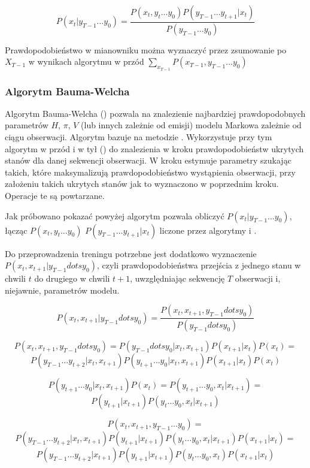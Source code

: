 $$P(x_t | y_{T-1} \dots y_0) = \frac{P(x_t, y_t \dots y_0) P(y_{T-1} \dots y_{t+1} | x_t)}{P(y_{T-1} \dots y_0)}$$

Prawdopodobieństwo w mianowniku można wyznaczyć przez zsumowanie po $X_{T-1}$ w wynikach algorytmu w przód $\sum_{x_{T-1}} P(x_{T-1}, y_{T-1} \dots y_0)$

\subsubsection{Algorytm Bauma-Welcha}

Algorytm Bauma-Welcha () pozwala na znalezienie najbardziej prawdopodobnych parametrów
$H$, $\pi$, $V$ (lub innych zależnie od emisji) modelu Markowa zależnie od ciągu obserwacji. Algorytm bazuje na metodzie
. Wykorzystuje przy tym algorytm w przód i w tył () 
do znalezienia w kroku  prawdopodobieństw ukrytych stanów dla danej sekwencji obserwacji. 
W kroku  estymuje parametry szukając takich, które maksymalizują prawdopodobieństwo wystąpienia
obserwacji, przy założeniu takich ukrytych stanów jak to wyznaczono w poprzednim kroku. Operacje te są powtarzane.

Jak próbowano pokazać powyżej algorytm  pozwala obliczyć $P(x_t | y_{T-1} \dots y_0)$, 
łącząc $P(x_t, y_t \dots y_0)$ $P(y_{T-1} \dots y_{t+1} | x_t)$ liczone przez algorytmy  i .

Do przeprowadzenia treningu  potrzebne jest dodatkowo wyznaczenie $P(x_t, x_{t+1} | y_{T-1} dots y_0)$, 
czyli prawdopodobieństwa przejścia z jednego stanu w chwili $t$ do drugiego w chwili $t+1$, 
uwzględniając sekwencję $T$ obserwacji i, niejawnie, parametrów modelu. 

$$P(x_t, x_{t+1} | y_{T-1} dots y_0)
= \frac{P(x_t, x_{t+1}, y_{T-1} dots y_0)}{P(y_{T-1} dots y_0)}$$

$$P(x_t, x_{t+1}, y_{T-1} dots y_0) = P(y_{T-1} dots y_0 | x_t, x_{t+1}) P(x_{t+1} | x_t) P(x_t) = $$
$$P(y_{T-1} \dots y_{t+2} | x_t, x_{t+1}) P(y_{t+1} \dots y_0 | x_t, x_{t+1}) P(x_{t+1} | x_t) P(x_t)$$

$$P(y_{t+1} \dots y_0 | x_t, x_{t+1}) P(x_t) = P(y_{t+1} \dots y_0, x_t | x_{t+1}) = $$
$$P(y_{t+1} | x_{t+1}) P(y_t \dots y_0, x_t | x_{t+1})$$

$$P(x_t, x_{t+1}, y_{T-1} \dots y_0) =$$
$$P(y_{T-1} \dots y_{t+2} | x_t, x_{t+1}) P(y_{t+1} | x_{t+1}) P(y_t \dots y_0, x_t | x_{t+1}) P(x_{t+1} | x_t) =$$
$$P(y_{T-1} \dots y_{t+2} | x_{t+1}) P(y_{t+1} | x_{t+1}) P(y_t \dots y_0, x_t) P(x_{t+1} | x_t)$$

